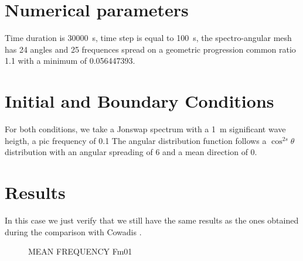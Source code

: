 %
\section{Numerical parameters}
%
Time duration is 30000~s, time step is equal to 100~s, the spectro-angular
mesh has 24 angles and 25 frequences spread on a geometric progression common
ratio 1.1 with a minimum of 0.056447393.

\section{Initial and Boundary Conditions}
%
For both conditions, we take a Jonswap spectrum with a 1~m significant wave
heigth, a pic frequency of 0.1 The angular distribution function follows a
$\cos^{2s} \theta$ distribution with an angular spreading of 6 and a mean
direction of 0.


%
%
\section{Results}
In this case we just verify that we still have the same results as the ones
obtained during the comparison with Cowadis \cite{cowadis}.
\begin{figure} [!h]
\centering
{}
 \caption{MEAN FREQUENCY Fm01}\label{resultsbf}
\end{figure}

